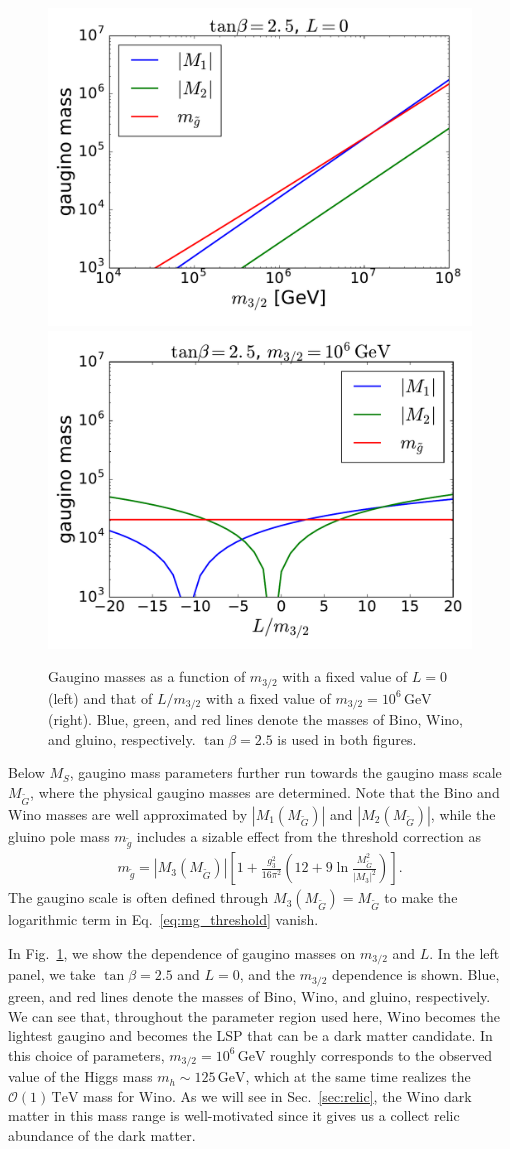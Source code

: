\documentclass[12pt,twoside,book]{article}
\begin{document}
\begin{figure}
  \centering
  \includegraphics[width=0.48\hsize]{amsb_m32.pdf}
  \includegraphics[width=0.48\hsize]{amsb_L.pdf}
  \caption{
    Gaugino masses as a function of $m_{3/2}$ with a fixed value of $L = 0$ (left) and that of $L / m_{3/2}$ with a fixed value of $m_{3/2} = 10^6\,\mathrm{GeV}$ (right).
    Blue, green, and red lines denote the masses of Bino, Wino, and gluino, respectively.
    $\tan\beta = 2.5$ is used in both figures.
  }
  \label{fig:amsb_spectrum}
\end{figure}

Below $M_S$, gaugino mass parameters further run towards the gaugino mass scale $M_{\tilde{G}}$, where the physical gaugino masses are determined.
Note that the Bino and Wino masses are well approximated by $|M_1 (M_{\tilde{G}})|$ and $|M_2 (M_{\tilde{G}})|$, while the gluino pole mass $m_{\tilde{g}}$ includes a sizable effect from the threshold correction as \cite{Giudice:2004tc}
\begin{align}
  m_{\tilde{g}} = \left| M_3 (M_{\tilde{G}}) \right| \left[
  1 + \frac{g_3^2}{16\pi^2} \left( 12 + 9\ln \frac{M_{\tilde{G}}^2}{|M_3|^2} \right)
  \right].
  \label{eq:mg_threshold}
\end{align}
The gaugino scale is often defined through $M_3 (M_{\tilde{G}}) = M_{\tilde{G}}$ to make the logarithmic term in Eq.~\eqref{eq:mg_threshold} vanish.

In Fig.~\ref{fig:amsb_spectrum}, we show the dependence of gaugino masses on $m_{3/2}$ and $L$.
In the left panel, we take $\tan\beta = 2.5$ and $L=0$, and the $m_{3/2}$ dependence is shown.
Blue, green, and red lines denote the masses of Bino, Wino, and gluino, respectively.
We can see that, throughout the parameter region used here, Wino becomes the lightest gaugino and becomes the LSP that can be a dark matter candidate.
In this choice of parameters, $m_{3/2} = 10^6\,\mathrm{GeV}$ roughly corresponds to the observed value of the Higgs mass $m_h \sim 125\,\mathrm{GeV}$, which at the same time realizes the $\mathcal{O}(1)\,\mathrm{TeV}$ mass for Wino.
As we will see in Sec.~\ref{sec:relic}, the Wino dark matter in this mass range is well-motivated since it gives us a collect relic abundance of the dark matter.
\end{document}
